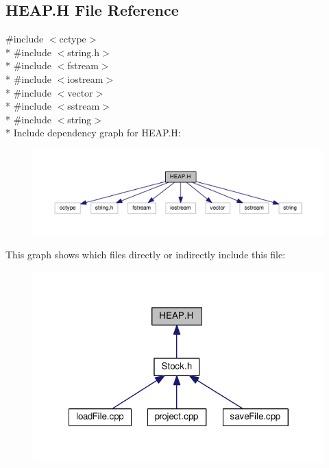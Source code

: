 \hypertarget{HEAP_8H}{\subsection{H\+E\+A\+P.\+H File Reference}
\label{HEAP_8H}
}
{\ttfamily \#include $<$cctype$>$}\\*
{\ttfamily \#include $<$string.\+h$>$}\\*
{\ttfamily \#include $<$fstream$>$}\\*
{\ttfamily \#include $<$iostream$>$}\\*
{\ttfamily \#include $<$vector$>$}\\*
{\ttfamily \#include $<$sstream$>$}\\*
{\ttfamily \#include $<$string$>$}\\*
Include dependency graph for H\+E\+A\+P.\+H\+:\nopagebreak
\begin{figure}[H]
\begin{center}
\leavevmode
\includegraphics[width=350pt]{HEAP_8H__incl}
\end{center}
\end{figure}
This graph shows which files directly or indirectly include this file\+:\nopagebreak
\begin{figure}[H]
\begin{center}
\leavevmode
\includegraphics[width=322pt]{HEAP_8H__dep__incl}
\end{center}
\end{figure}
